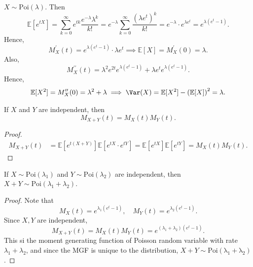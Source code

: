 \begin{eg}
    \(X \sim \mathrm{Poi}(\lambda ) \). Then 
    \[
        \mathbb{E} [e^{tX}] = \sum_{k=0}^{\infty} e^{tk} \frac{e^{-\lambda } \lambda ^k}{k!} = e^{-\lambda } \sum_{k=0}^{\infty} \frac{(\lambda e^t)^k}{k!} = e^{-\lambda } \cdot e^{\lambda e^t} = e^{\lambda (e^t - 1)}.  
    \] 
    Hence,
    \[
        M_X ^{\prime} (t) = e^{\lambda (e^t - 1)} \cdot \lambda e^t \implies \mathbb{E} [X] = M_X^{\prime} (0) = \lambda.
    \]
    Also,
    \[
        M_X^{\prime\prime} (t) = \lambda ^2 e^{2 t} e^{\lambda (e^t - 1)} + \lambda e^t e^{\lambda (e^t - 1)}.
    \]
    Hence,
    \[
        \mathbb{E} [X^2] = M_X^{\prime\prime} (0) = \lambda ^2 + \lambda \implies \Var(X) = \mathbb{E} [X^2] - \left( \mathbb{E} [X] \right)^2 = \lambda . 
    \]
\end{eg}

\begin{proposition}
    If \(X\) and \(Y\) are independent, then 
    \[
        M_{X + Y}(t) = M_X(t) M_Y(t).
    \]  
\end{proposition}

\begin{proof}
    \begin{align*}
        M_{X + Y}(t) &= \mathbb{E} [e^{t(X + Y)}] \mathbb{E} [e^{tX} \cdot e^{tY}] = \mathbb{E} [e^{tX}] \mathbb{E} [e^{tY}] = M_X(t) M_Y(t).
    \end{align*}
\end{proof}

\begin{corollary}
    If \(X \sim \mathrm{Poi}(\lambda _1) \) and \(Y \sim \mathrm{Poi}(\lambda _2) \) are independent, then \(X + Y \sim \mathrm{Poi}(\lambda _1 + \lambda _2) \).   
\end{corollary}

\begin{proof}
    Note that 
    \[
        M_X(t) = e^{\lambda _1 (e^t - 1)}, \quad M_Y(t) = e^{\lambda _2 (e^t - 1)}.
    \]
    Since \(X, Y\) are independent,
    \[
        M_{X + Y}(t) = M_X(t) M_Y(t) = e^{(\lambda _1 + \lambda _2) (e^t - 1)}.
    \] 
    This si the moment generating function of Poisson random variable with rate \(\lambda _1 + \lambda _2\), and since the MGF is unique to the distribution, \(X + Y \sim \mathrm{Poi(\lambda _1 + \lambda _2)} \).  
\end{proof}

